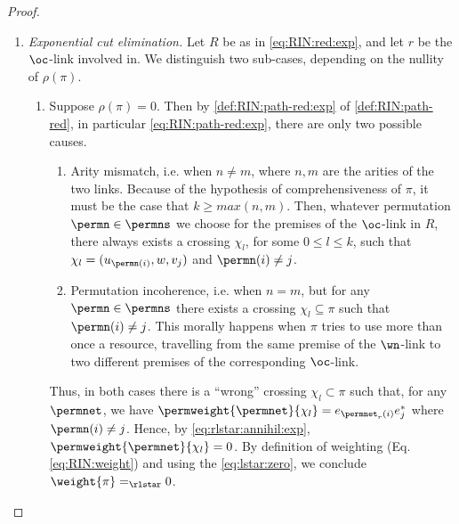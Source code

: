 \begin{proof}
\begin{enumerate}
\item \textit{Exponential cut elimination.}
  Let $R$ be as in \autoref{eq:RIN:red:exp}, and let $r$ be 
  the $\oc$-link involved in.
  We distinguish two sub-cases, depending on the nullity of $\rho(\pi)$.
  \begin{enumerate}
  \item Suppose $\rho(\pi) = 0$.
    Then by \autoref{def:RIN:path-red:exp} of \autoref{def:RIN:path-red},
    in particular \autoref{eq:RIN:path-red:exp},
    there are only two possible causes.
    \begin{enumerate}
    \item Arity mismatch,
      i.e. when $n \neq m$, where $n,m$ are the arities of the two links.
      Because of the hypothesis of comprehensiveness of $\pi$,
      it must be the case that $k \geq max(n,m)$.
      Then, whatever permutation $\permn \in \permns$ we choose for the 
      premises of the $\oc$-link in $R$,
      there always exists a crossing $\chi_l$, for some $0 \leq l \leq k$,
      such that $\chi_l = (u_{\permn(i)},w,v_j)$ and $\permn(i) \neq j$.
    \item Permutation incoherence,
      i.e. when $n = m$, but for any $\permn \in \permns$
      there exists a crossing $\chi_l \subseteq \pi$ such that
      $\permn(i) \neq j$.
      This morally happens when $\pi$ tries to use more than once a 
      resource, travelling from the same premise of the $\wn$-link to two 
      different premises of the corresponding $\oc$-link.
    \end{enumerate}
    Thus, in both cases there is a ``wrong'' crossing $\chi_l \subset \pi$ such 
    that, for any $\permnet$, we have
    $\permweight{\permnet}{\chi_l} = e_{{\permnet}_r(i)} e_j^*$ where
    $\permn(i) \neq j$.
    Hence, by \autoref{eq:rlstar:annihil:exp},
    $\permweight{\permnet}{\chi_l} = 0$.
    By definition of weighting (Eq. \ref{eq:RIN:weight}) and using 
    the \autoref{eq:lstar:zero}, we conclude
    $\weight{\pi} =_\rlstar 0$.


\end{enumerate}
\end{enumerate}
\end{proof}
